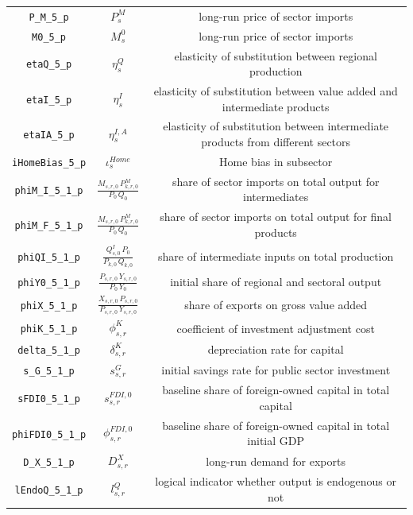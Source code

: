 \begin{center}
\begin{longtable}{ccc}
\texttt{P\_M\_5\_p} & ${P^{M}_{s}}$ & long-run price of sector imports\\
\texttt{M0\_5\_p} & ${M^{0}_{s}}$ & long-run price of sector imports\\
\texttt{etaQ\_5\_p} & ${\eta^{Q}_{s}}$ & elasticity of substitution between regional production\\
\texttt{etaI\_5\_p} & ${\eta^{I}_{s}}$ & elasticity of substitution between value added and intermediate products\\
\texttt{etaIA\_5\_p} & ${\eta^{I,A}_{s}}$ & elasticity of substitution between intermediate products from different sectors\\
\texttt{iHomeBias\_5\_p} & ${\iota^{Home}_{s}}$ & Home bias in subsector\\
\texttt{phiM\_I\_5\_1\_p} & $\frac{M_{s,r,0} \, P^{M}_{k,r,0}}{P_{0} \, Q_{0}}$ & share of sector imports on total output for intermediates\\
\texttt{phiM\_F\_5\_1\_p} & $\frac{M_{s,r,0} \, P^{M}_{k,r,0}}{P_{0} \, Q_{0}}$ & share of sector imports on total output for final products\\
\texttt{phiQI\_5\_1\_p} & $\frac{Q^{I}_{s,0} \, P_{0}}{P_{k,0} \, Q_{k,0}}$ & share of intermediate inputs on total production\\
\texttt{phiY0\_5\_1\_p} & $\frac{P_{s,r,0} \, Y_{s,r,0}}{P_{0} \, Y_{0}}$ & initial share of regional and sectoral output\\
\texttt{phiX\_5\_1\_p} & $\frac{X_{s,r,0} \, P_{s,r,0}}{P_{s,r,0} \, Y_{s,r,0}}$ & share of exports on gross value added\\
\texttt{phiK\_5\_1\_p} & ${\phi^{K}_{s,r}}$ & coefficient of investment adjustment cost\\
\texttt{delta\_5\_1\_p} & ${\delta^{K}_{s,r}}$ & depreciation rate for capital\\
\texttt{s\_G\_5\_1\_p} & ${s^{G}_{s,r}}$ & initial savings rate for public sector investment\\
\texttt{sFDI0\_5\_1\_p} & ${s^{FDI,0}_{s,r}}$ & baseline share of foreign-owned capital in total capital\\
\texttt{phiFDI0\_5\_1\_p} & ${\phi^{FDI,0}_{s,r}}$ & baseline share of foreign-owned capital in total initial GDP\\
\texttt{D\_X\_5\_1\_p} & ${D^{X}_{s,r}}$ & long-run demand for exports\\
\texttt{lEndoQ\_5\_1\_p} & ${l^{Q}_{s,r}}$ & logical indicator whether output is endogenous or not\\

\end{longtable}
\end{center}
